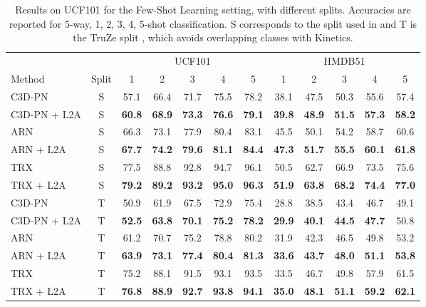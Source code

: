 \documentclass[runningheads]{llncs}
\newcommand{\MethodShort}{L2A\xspace}
\begin{document}
\begin{table}
\centering
\resizebox{\columnwidth}{!}
{
\begin{tabular}{l@{\ }ccccccccccc}
     &  & \multicolumn{5}{c}{UCF101} & \multicolumn{5}{c}{HMDB51}\\
Method & Split & 1 & 2 & 3 & 4 & 5 & 1 & 2 & 3 & 4 & 5\\
\hline
C3D-PN \cite{pn} & S & 57.1 & 66.4 & 71.7 & 75.5 & 78.2 & 38.1 & 47.5 & 50.3 & 55.6 & 57.4 \\
C3D-PN + \MethodShort & S & \textbf{60.8} & \textbf{68.9} & \textbf{73.3} & \textbf{76.6} & \textbf{79.1}& \textbf{39.8} & \textbf{48.9} & \textbf{51.5} & \textbf{57.3} & \textbf{58.2} \\
\hline
ARN \cite{arn} & S & 66.3 & 73.1 & 77.9 & 80.4 & 83.1 & 45.5 & 50.1 & 54.2 & 58.7 & 60.6\\
ARN + \MethodShort & S & \textbf{67.7} & \textbf{74.2} & \textbf{79.6} & \textbf{81.1} & \textbf{84.4} & \textbf{47.3} & \textbf{51.7} & \textbf{55.5} & \textbf{60.1} & \textbf{61.8}\\
\hline
TRX \cite{trx} & S & 77.5 & 88.8 & 92.8 & 94.7 & 96.1 & 50.5 & 62.7 & 66.9 & 73.5 & 75.6 \\
TRX + \MethodShort & S & \textbf{79.2} & \textbf{89.2} & \textbf{93.2} & \textbf{95.0} & \textbf{96.3} & \textbf{51.9} & \textbf{63.8} & \textbf{68.2} & \textbf{74.4} & \textbf{77.0} \\
\hline
C3D-PN \cite{pn} & T & 50.9 & 61.9 & 67.5 & 72.9 & 75.4 & 28.8 & 38.5 & 43.4 & 46.7 & 49.1\\
C3D-PN + \MethodShort & T & \textbf{52.5} & \textbf{63.8} & \textbf{70.1} & \textbf{75.2} & \textbf{78.2} & \textbf{29.9} & \textbf{40.1} & \textbf{44.5} & \textbf{47.7} & {50.8}  \\
\hline 
ARN \cite{arn} & T & 61.2 & 70.7 & 75.2 & 78.8 & 80.2 & 31.9 & 42.3 & 46.5 & 49.8 & 53.2\\
ARN + \MethodShort & T & \textbf{63.9} & \textbf{73.1} & \textbf{77.4} & \textbf{80.4} & \textbf{81.3} & \textbf{33.6} & \textbf{43.7} & \textbf{48.0} & \textbf{51.1} & \textbf{53.8} \\
\hline
TRX \cite{trx} & T & 75.2 & 88.1 & 91.5 & 93.1 & 93.5 & 33.5 & 46.7 & 49.8 & 57.9 & 61.5\\
TRX + \MethodShort & T & \textbf{76.8} & \textbf{88.9} & \textbf{92.7} & \textbf{93.8} & \textbf{94.1} & \textbf{35.0} & \textbf{48.1} & \textbf{51.1} & \textbf{59.2} & \textbf{62.1}\\
\end{tabular}}
\caption{Results on UCF101 for the Few-Shot Learning setting, with different splits. Accuracies are reported for 5-way, 1, 2, 3, 4, 5-shot classification. S corresponds to the split used in \cite{arn,trx} and T is the TruZe split \cite{truze}, which avoids overlapping classes with Kinetics.}
\label{tab:fslucf}
\end{table}
\end{document}
